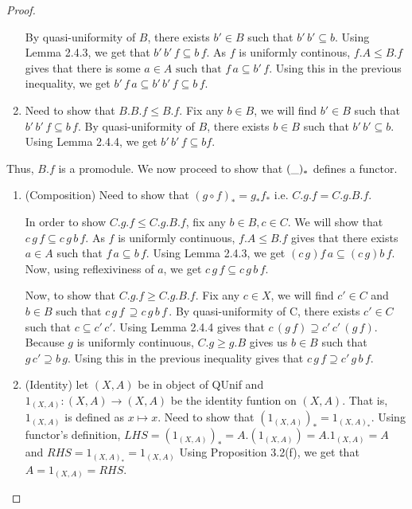 \documentclass[18pt,a4paper]{article}
\theoremstyle{definition}
\begin{document}
\begin{proof}
\begin{enumerate}[label=(\roman*)]
					By quasi-uniformity of $B$, there exists $b' \in B$ such that $b'\,b'
					\subseteq b$. Using Lemma 2.4.3, we get that $b'\,b'\,f \subseteq b\,f$.
					As $f$ is uniformly continous, $f.A \leq B.f$ gives that there is some
					$a \in A \text{ such that } f\,a \subseteq b'\,f$. Using this in the
					previous inequality, we get $b'\,f\,a \subseteq b'\,b'\,f\subseteq  b\,f$.
				\item Need to show that $B.B.f \leq B.f$. Fix any $b \in B$, we will find
					$b' \in B$ such that $b'\,b'\,f \subseteq b\,f$.
					By quasi-uniformity of $B$, there exists $b \in B$ such that
					$b'\,b' \subseteq  b$. Using Lemma 2.4.4, we get $b'\,b'\,f \subseteq bf$.
			\end{enumerate}
			Thus, $B.f$ is a promodule. We now proceed to show that $(\string _)_*$ defines a functor.
			\begin{enumerate}[label=(\roman*)]
				\item (Composition) Need to show that $(g\circ f)_*=g_*f_*$ i.e. $C.g.f=C.g.B.f$.

					In order to show $C.g.f \leq C.g.B.f$, fix any $b\in B, c\in C$.
					We will show that $c\,g\,f \subseteq c\,g\,b\,f$. As $f$ is uniformly
					continuous, $f.A \leq B.f$ gives that there exists $a \in A$ such that
					$f\,a \subseteq b\,f$. Using Lemma 2.4.3, we get $(c\,g)f\,a \subseteq
					(c\,g)b\,f$. Now, using reflexiviness of $a$, we get $c\,g\,f \subseteq
					c\,g\,b\,f$.

					Now, to show that $C.g.f \geq C.g.B.f$. Fix any $c \in X$, we will find $c' \in C$ and
					$b \in B$ such that $c\, g\, f\, \supseteq c\, g\, b\, f\, $. By quasi-uniformity of C,
					there exists $c' \in C$ such that $c \subseteq  c'\, c'$. Using Lemma 2.4.4
					gives that $c\, (g\, f)\supseteq c'\, c'\, (g\, f) $. Because $g$ is uniformly
					continuous, $C.g \geq g.B$ gives us $b\in B$ such that $g\, c' \supseteq b\, g$.
					Using this in the previous inequality gives that $c\, g\, f \supseteq c'\, g\, b\, f$.

				\item(Identity) let $(X,A)$ be in object of QUnif and
					$1_{(X,A)}:(X,A)\to(X,A)$ be the identity funtion on $(X,A)$. That is,
					$1_{(X,A)}$ is defined as $x\mapsto x$.
					Need to show that $(1_{(X,A)})_*=1_{(X,A)_*}$. Using
					functor's definition, $LHS=(1_{(X,A)})_*=A.(1_{(X,A)})=A.1_{(X,A)}=A$
					and $RHS=1_{(X,A)_*}=1_{(X,A)}$
					Using Proposition 3.2(f), we get that $A=1_{(X,A)}=RHS$. \qedhere
			\end{enumerate}
		\end{proof}
\end{document}
